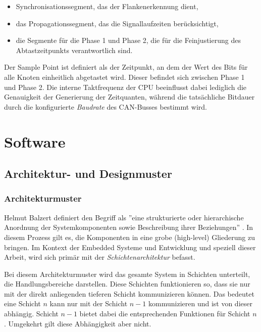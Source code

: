 \begin{itemize}
	\item Synchronisationssegment, das der Flankenerkennung dient, 
	\item das Propagationssegment, das die Signallaufzeiten berücksichtigt,
	\item die Segmente für die Phase 1 und Phase 2, die für die Feinjustierung des Abtastzeitpunkts verantwortlich sind.
\end{itemize}

Der Sample Point ist definiert als der Zeitpunkt, an dem der Wert des Bits für alle Knoten einheitlich abgetastet wird. 
Dieser befindet sich zwischen Phase 1 und Phase 2. 
Die interne Taktfrequenz der CPU beeinflusst dabei lediglich die Genauigkeit der Generierung der Zeitquanten, während die tatsächliche Bitdauer durch die konfigurierte \emph{Baudrate} des CAN-Busses bestimmt wird.


\section{Software}

\label{sec:architecture_design_pattern}
\subsection{Architektur- und Designmuster}

\subsubsection{Architekturmuster}
Helmut Balzert definiert den Begriff als ''eine strukturierte oder hierarchische Anordnung der Systemkomponenten sowie Beschreibung ihrer Beziehungen'' \cite{balzert2011softwaretechnik2}.
In diesem Prozess gilt es, die Komponenten in eine grobe (high-level) Gliederung zu bringen.
Im Kontext der Embedded Systeme und Entwicklung und speziell dieser Arbeit, wird sich primär mit der \emph{Schichtenarchitektur} befasst.

Bei diesem Architekturmuster wird das gesamte System in Schichten unterteilt, die  Handlungsbereiche darstellen.
Diese Schichten funktionieren so, dass sie nur mit der direkt anliegenden tieferen Schicht kommunizieren können.
Das bedeutet eine Schicht $n$ kann nur mit der Schicht $n-1$ kommunizieren und ist von dieser abhängig.
Schicht $n-1$ bietet dabei die entsprechenden Funktionen für Schicht $n$.
Umgekehrt gilt diese Abhängigkeit aber nicht.

